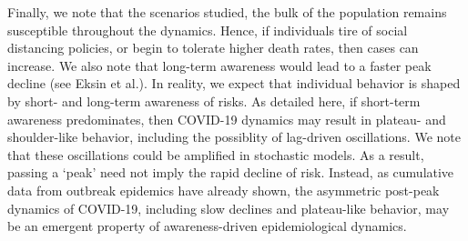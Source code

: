 Finally, we note that the scenarios studied, the bulk of the population remains
susceptible throughout the dynamics. Hence, if individuals tire of social
distancing policies, or begin to tolerate higher death rates, then cases can
increase. We also note that long-term awareness would lead to a faster
peak decline (see Eksin et al.). In reality, we expect that individual
behavior is shaped by short- and long-term awareness of risks.  As detailed here,
if short-term awareness predominates, then COVID-19 dynamics may result
in plateau- and shoulder-like behavior, including the possiblity of 
lag-driven oscillations.  We note that these oscillations could be amplified 
in stochastic models.  As a result, passing a `peak' need not imply
the rapid decline of risk. Instead, as cumulative data from outbreak epidemics have already
shown, the asymmetric post-peak dynamics of COVID-19, including
slow declines and plateau-like behavior, may be an emergent
property of awareness-driven epidemiological dynamics.
